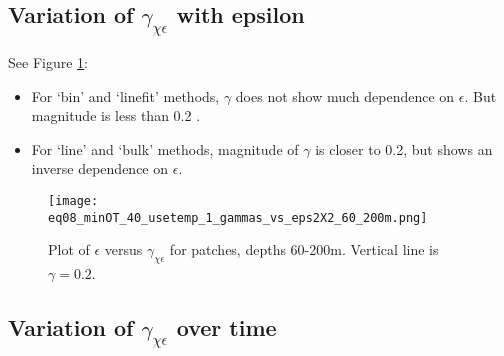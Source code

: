 \documentclass[11pt]{article}
\begin{document}
%
%


\clearpage
\subsection{Variation of $\gamma_{\chi\epsilon}$ with epsilon}

See Figure \ref{epsvsgam}:
\begin{itemize}
\item For `bin' and `linefit' methods, $\gamma$ does not show much dependence on $\epsilon$. But magnitude is less than 0.2 .
\item For `line' and `bulk' methods, magnitude of $\gamma$ is closer to 0.2, but shows an inverse dependence on $\epsilon$.
\end{itemize}


\begin{figure}[htbp]
\texttt{[image: eq08\_minOT\_40\_usetemp\_1\_gammas\_vs\_eps2X2\_60\_200m.png]}
\caption{Plot of $\epsilon$  versus $\gamma_{\chi\epsilon}$ for patches, depths 60-200m.  Vertical line is $\gamma=0.2$.}
\label{epsvsgam}
\end{figure}




\clearpage
\subsection{Variation of $\gamma_{\chi\epsilon}$ over time}
\end{document}
